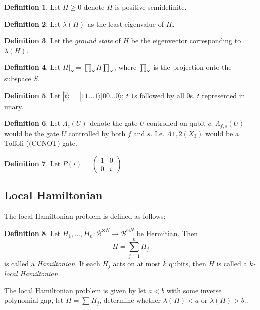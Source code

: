 \documentclass{article}
\theoremstyle{definition}
\newtheorem{definition}{Definition}[section]
\begin{document}
\begin{definition}
	Let $H\geq0$ denote $H$ is positive semidefinite.
\end{definition}

\begin{definition}
	Let $\lambda(H)$ as the least eigenvalue of $H$.
\end{definition}

\begin{definition}
	Let the \emph{ground state} of $H$ be the eigenvector corresponding to $\lambda(H)$.
\end{definition}

\begin{definition}
	Let $H\big|_S=\prod_SH\prod_S$, where $\prod_S$ is the projection onto the subspace $S$.
\end{definition}

\begin{definition}
	Let $|\widehat{t}\rangle=|11\ldots1\rangle |00\ldots0\rangle$; $t$ $1$s followed by all $0$s. $t$ represented in unary.
\end{definition}

\begin{definition}
	Let $\Lambda_c(U)$ denote the gate $U$ controlled on qubit $c$. $\Lambda_{f, s}(U)$ would be the gate $U$ controlled by both $f$ and $s$. I.e. $\Lambda{1, 2}(X_3)$ would be a Toffoli ((CCNOT) gate.
\end{definition}

\begin{definition}
	Let $P(i)=\begin{pmatrix}1&0\\0&i\end{pmatrix}$
\end{definition}

\subsection{Local Hamiltonian}

The local Hamiltonian problem is defined as follows:

\begin{definition}
	Let $H_1, \ldots, H_n:\mathcal{B}^{\otimes N}\rightarrow\mathcal{B}^{\otimes N}$ be Hermitian. Then $$H=\sum_{j=1}^nH_j$$ is called a \emph{Hamiltonian}.
	If each $H_j$ acts on at most $k$ qubits, then $H$ is called a \emph{$k$-local Hamiltonian}.
\end{definition}

The local Hamiltonian problem is given by let $a<b$ with some inverse polynomial gap, let $H=\sum H_j$, determine whether $\lambda(H)<a$ or $\lambda(H)>b$..
\end{document}
